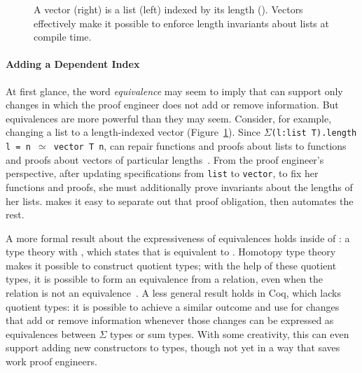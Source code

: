\begin{figure}
\begin{minipage}{0.44\textwidth}
   
\end{minipage}
\hfill
\begin{minipage}{0.55\textwidth}
   
\end{minipage}
\caption{A vector (right) is a list (left) indexed by its length (). Vectors effectively make it possible to enforce length invariants about lists at compile time.}
\label{fig:listtovect}
\end{figure}

\paragraph{Adding a Dependent Index}
At first glance, the word \textit{equivalence} may seem to imply that \toolnamec can support only changes in
which the proof engineer does not add or remove information.
But equivalences are more powerful than they may seem.
Consider, for example, changing a list to a length-indexed vector (Figure~\ref{fig:listtovect}).
Since $\Sigma$\lstinline{(l:list T).length l = n }$\simeq$\lstinline{ vector T n},
\toolnamec can repair functions and proofs about lists to functions and proofs about vectors of particular lengths~\href{https://github.com/uwplse/pumpkin-pi/blob/v2.0.0/plugin/coq/examples/Example.v}{}. %
From the proof engineer's perspective, after updating specifications from \lstinline{list} to \lstinline{vector},
to fix her functions and proofs, she must additionally prove invariants about the lengths of her lists.
\toolnamec makes it easy to separate out that proof obligation, then automates the rest.

A more formal result about the expressiveness of equivalences holds inside of :
a type theory with , which states that  is equivalent to .
Homotopy type theory makes it possible to construct quotient types;
with the help of these quotient types, it is possible to form an equivalence
from a relation, even when the relation is not an equivalence~\cite{angiuli2020internalizing}.
A less general result holds in Coq, which lacks quotient types:
it is possible to achieve a similar outcome and use \toolnamec for changes that add or remove information
whenever those changes can be expressed as equivalences between $\Sigma$ types or sum types.
With some creativity, this can even support adding new constructors to types,
though not yet in a way that saves work proof engineers.

